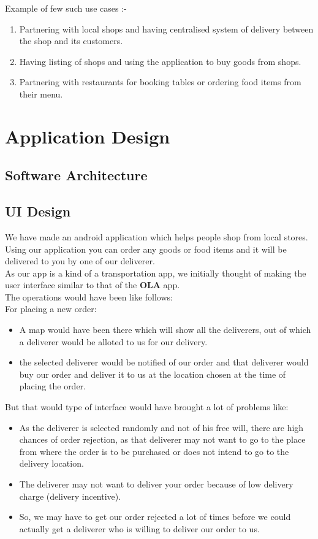\documentclass{report}
\begin{document}
Example of few such use cases :-
\begin{enumerate}[label=\alph*.]
\item Partnering with local shops and having centralised system of delivery between the shop and its customers. 
\item Having listing of shops and using the application to buy goods from shops.
\item Partnering with restaurants for booking tables or ordering food items from their menu.
\end{enumerate}

\chapter{Application Design}
\section{Software Architecture}

\section{UI Design}
We have made an android application which helps people shop from local stores. Using our application you can order any goods or food items and it will be delivered to you by one of our deliverer.\\

As our app is a kind of a transportation app, we initially thought of making the user interface similar to that of the \textbf{OLA} app.\\
The operations would have been like follows:\\

For placing a new order:
\begin{itemize}
\item A map would have been there which will show all the deliverers, out of which a deliverer would be alloted to us for our delivery.
\item the selected deliverer would be notified of our order and that deliverer would buy our order and deliver it to us at the location chosen at the time of placing the order.
\end{itemize}

But that would type of interface would have brought a lot of problems like:
\begin{itemize}
\item As the deliverer is selected randomly and not of his free will, there are high chances of order rejection, as that deliverer may not want to go to the place from where the order is to be purchased or does not intend to go to the delivery location.
\item The deliverer may not want to deliver your order because of low delivery charge (delivery incentive).
\item So, we may have to get our order rejected a lot of times before we could actually get a deliverer who is willing to deliver our order to us.
\end{itemize}
\end{document}
